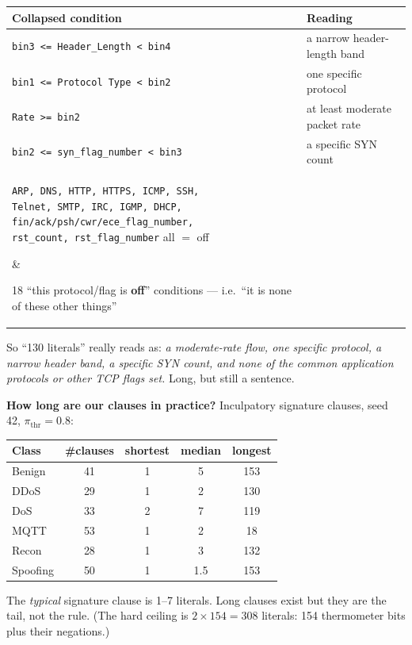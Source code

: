 \documentclass[11pt]{article}
\begin{document}
\begin{center}
\footnotesize
\begin{tabular}{@{}ll@{}}
\toprule
Collapsed condition & Reading \\
\midrule
\texttt{bin3 <= Header\_Length < bin4} & a narrow header-length band \\
\texttt{bin1 <= Protocol Type < bin2}  & one specific protocol \\
\texttt{Rate >= bin2}                  & at least moderate packet rate \\
\texttt{bin2 <= syn\_flag\_number < bin3} & a specific SYN count \\
\midrule
\parbox[t]{0.40\textwidth}{\texttt{ARP, DNS, HTTP, HTTPS, ICMP, SSH,\\
Telnet, SMTP, IRC, IGMP, DHCP,\\
fin/ack/psh/cwr/ece\_flag\_number,\\
rst\_count, rst\_flag\_number} all $=$ off}
& \parbox[t]{0.42\textwidth}{18 ``this protocol/flag is \textbf{off}'' conditions --- i.e.\ ``it is none of these other things''} \\[2pt]
\bottomrule
\end{tabular}
\end{center}

So ``130 literals'' really reads as: \emph{a moderate-rate flow, one specific
protocol, a narrow header band, a specific SYN count, and none of the common
application protocols or other TCP flags set.} Long, but still a sentence.

\textbf{How long are our clauses in practice?} Inculpatory signature clauses,
seed 42, $\pi_{\mathrm{thr}}=0.8$:

\begin{center}
\footnotesize
\begin{tabular}{@{}lcccc@{}}
\toprule
Class & \#clauses & shortest & \textbf{median} & longest \\
\midrule
Benign   & 41 & 1 & 5   & 153 \\
DDoS     & 29 & 1 & 2   & 130 \\
DoS      & 33 & 2 & 7   & 119 \\
MQTT     & 53 & 1 & 2   & 18  \\
Recon    & 28 & 1 & 3   & 132 \\
Spoofing & 50 & 1 & 1.5 & 153 \\
\bottomrule
\end{tabular}
\end{center}

The \emph{typical} signature clause is 1--7 literals. Long clauses exist but
they are the tail, not the rule. (The hard ceiling is $2\times154=308$
literals: 154 thermometer bits plus their negations.)
\end{document}
